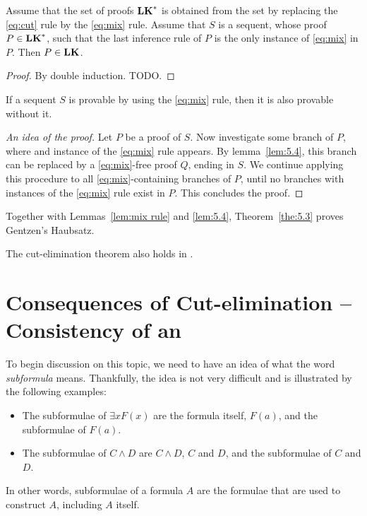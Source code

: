 \documentclass[11pt,a4paper]{article}
\begin{document}
\begin{lemma}[Lemma 5.4]\label{lem:5.4}
Assume that the set of proofs \(\textbf{LK}^\ast\) is obtained from
the set \LK{} by replacing the \eqref{eq:cut} rule by
the \eqref{eq:mix} rule. Assume that \(S\) is a sequent,
whose proof~\(P\in\textbf{LK}^\ast\), such that the last inference rule of \(P\)
is the only instance of \eqref{eq:mix} in \(P\).
Then \(P\in\textbf{LK}\).
\end{lemma}

\begin{proof}
    By double induction. TODO.
\end{proof}

\begin{theorem}[Theorem 5.3]\label{the:5.3}
    If a sequent \(S\) is provable by using the \eqref{eq:mix} rule,
    then it is also provable without it.
\end{theorem}

\begin{proof}[An idea of the proof]
    Let \(P\) be a proof of \(S\).
    Now investigate some branch of \(P\),
    where and instance of the \eqref{eq:mix} rule appears.
    By lemma~\ref{lem:5.4}, this branch can be replaced by
    a \eqref{eq:mix}-free proof \(Q\), ending in \(S\).
    We continue applying this procedure to all
    \eqref{eq:mix}-containing branches of \(P\),
    until no branches with instances of the \eqref{eq:mix} rule
    exist in \(P\). This concludes the proof.
\end{proof}

Together with Lemmas~\ref{lem:mix rule} and \ref{lem:5.4},
Theorem~\ref{the:5.3} proves Gentzen's Haubsatz.

\begin{theorem}[Theorem 5.5]\label{the:5.5}
    The cut-elimination theorem also holds in \LJ.
\end{theorem}

\section{Consequences of Cut-elimination -- Consistency of \LK{} an \LJ}

To begin discussion on this topic, we need to have an idea
of what the word \emph{subformula} means. Thankfully,
the idea is not very difficult and is illustrated by
the following examples:
\begin{itemize}
    \item
        The subformulae of \(\exists xF(x)\) are the formula itself,
        \(F(a)\), and the subformulae of \(F(a)\).
    \item
        The subformulae of \(C\land D\) are \(C\land D\), \(C\) and \(D\),
        and the subformulae of \(C\) and \(D\).
\end{itemize}
In other words, subformulae of a formula \(A\) are the formulae that are used
to construct \(A\), including \(A\) itself.
\end{document}
